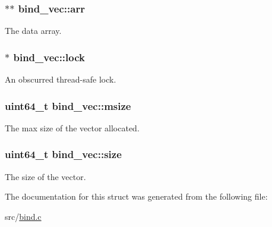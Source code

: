 \subsubsection[{\texorpdfstring{arr}{arr}}]{$\ast$$\ast$ bind\+\_\+vec\+::arr}\hypertarget{structbind__vec_a8bf39e88ad9a1715c7e6cfa4fa8028f4}{}\label{structbind__vec_a8bf39e88ad9a1715c7e6cfa4fa8028f4}


The data array. 

\subsubsection[{\texorpdfstring{lock}{lock}}]{$\ast$ bind\+\_\+vec\+::lock}\hypertarget{structbind__vec_af6053d8f0d9be5d8b03ffbc06f30c0a5}{}\label{structbind__vec_af6053d8f0d9be5d8b03ffbc06f30c0a5}


An obscurred thread-\/safe lock. 

\subsubsection[{\texorpdfstring{msize}{msize}}]{\setlength{\rightskip}{0pt plus 5cm}uint64\+\_\+t bind\+\_\+vec\+::msize}\hypertarget{structbind__vec_aa45fa0f2e32261123f693541f26fc12b}{}\label{structbind__vec_aa45fa0f2e32261123f693541f26fc12b}


The max size of the vector allocated. 

\subsubsection[{\texorpdfstring{size}{size}}]{\setlength{\rightskip}{0pt plus 5cm}uint64\+\_\+t bind\+\_\+vec\+::size}\hypertarget{structbind__vec_a322fa9fd253719971508bf013a668a64}{}\label{structbind__vec_a322fa9fd253719971508bf013a668a64}


The size of the vector. 



The documentation for this struct was generated from the following file\+:\begin{DoxyCompactItemize}
\item 
src/\hyperlink{bind_8c}{bind.\+c}\end{DoxyCompactItemize}
